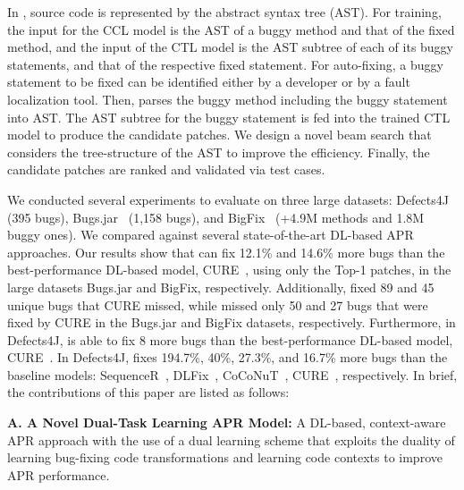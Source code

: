 In {\tool}, source code is represented by the abstract syntax tree
(AST). For training, the input for the CCL model is the AST of a buggy
method and that of the fixed method, and the input of the CTL model is
the AST subtree of each of its buggy statements, and that of the
respective fixed statement. For auto-fixing, a buggy statement to be
fixed can be identified either by a developer or by a fault
localization tool.  Then, {\tool} parses the buggy method including
the buggy statement into AST. The AST subtree for the buggy statement
is fed into the trained CTL model to produce the candidate patches. We
design a novel beam search that considers the tree-structure of the
AST to improve the efficiency. Finally, the candidate patches are
ranked and validated via test cases.

We conducted several experiments to evaluate {\tool} on three large
datasets: Defects4J~\cite{defects4j} (395 bugs),
Bugs.jar~\cite{saha2018bugs} (1,158 bugs), and
BigFix~\cite{yioopsla19} (+4.9M methods and 1.8M buggy ones).  We
compared {\tool} against several state-of-the-art DL-based APR
approaches.  Our results show that {\tool} can fix 12.1\% and 14.6\%
more bugs than the best-performance DL-based model,
CURE~\cite{cure-icse21}, using only the Top-1 patches, in the large
datasets Bugs.jar and BigFix, respectively. Additionally, {\tool}
fixed 89 and 45 unique bugs that CURE missed, while {\tool} missed
only 50 and 27 bugs that were fixed by CURE in the Bugs.jar and BigFix
datasets, respectively.  Furthermore, in Defects4J, {\tool} is able to
fix 8 more bugs than the best-performance DL-based model,
CURE~\cite{cure-icse21}.
In Defects4J, {\tool} fixes 194.7\%, 40\%, 27.3\%, and 16.7\% more
bugs than the baseline models: SequenceR~\cite{chen2018sequencer},
DLFix~\cite{li2020dlfix}, CoCoNuT~\cite{lutellier2020coconut},
CURE~\cite{cure-icse21}, respectively. In brief, the contributions of
this paper are listed as follows:


{\bf A. A Novel Dual-Task Learning APR Model:} A DL-based,
context-aware APR approach with the use of a dual learning scheme that
exploits the duality of learning bug-fixing code transformations and
learning code contexts to improve APR performance.

